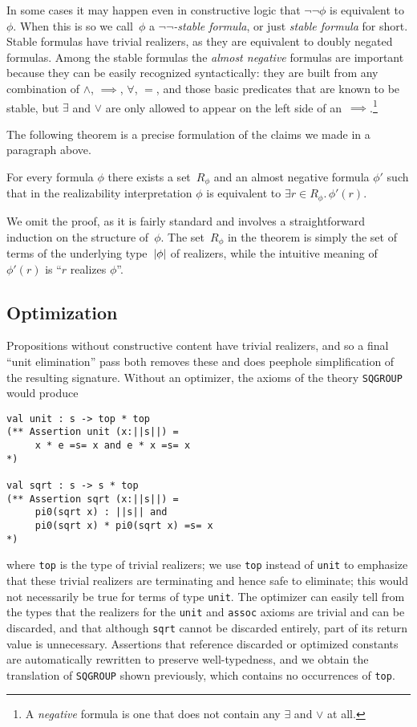 In some cases it may happen even in constructive logic that
$\lnot\lnot\phi$ is equivalent to~$\phi$. When this is so we
call~$\phi$ a \emph{$\lnot\lnot$-stable formula}, or just \emph{stable
  formula} for short. Stable formulas have trivial realizers, as they
are equivalent to doubly negated formulas. Among the stable formulas
the \emph{almost negative} formulas are important because they can be
easily recognized syntactically: they are built from any combination
of $\land$, $\implies$, $\forall$, $=$, and those basic predicates
that are known to be stable, but $\exists$ and $\lor$ are only allowed
to appear on the left side of an~$\implies$.\footnote{A
  \emph{negative} formula is one that does not contain any $\exists$
  and $\lor$ at all.}

The following theorem is a precise formulation of the claims we made
in a paragraph above.

\begin{theorem}
  For every formula $\phi$ there exists a set~$R_\phi$ and an almost
  negative formula $\phi'$ such that in the realizability
  interpretation $\phi$ is equivalent to $\exists r \in R_\phi . \,
  \phi'(r)$.
\end{theorem}

We omit the proof, as it is fairly standard and involves a
straightforward induction on the structure of~$\phi$. The set~$R_\phi$
in the theorem is simply the set of terms of the underlying
type~$|\phi|$ of realizers, while the intuitive meaning of
$\phi'(r)$ is ``$r$ realizes $\phi$''.





\subsection{Optimization}
Propositions without constructive content have trivial realizers, and
so a final ``unit elimination'' pass both removes these and does 
peephole simplification of the resulting signature.   Without an optimizer,
the axioms of the theory \Verb|SQGROUP| would produce
\begin{Verbatim}
val unit : s -> top * top
(** Assertion unit (x:||s||) =  
     x * e =s= x and e * x =s= x
*)

val sqrt : s -> s * top
(** Assertion sqrt (x:||s||) =  
     pi0(sqrt x) : ||s|| and 
     pi0(sqrt x) * pi0(sqrt x) =s= x
*)
\end{Verbatim}
where \Verb|top| is the type of trivial realizers; we use 
\Verb|top| instead of \Verb|unit| to emphasize that these trivial realizers are terminating and hence safe to eliminate; this would not necessarily
be true for terms of type \Verb|unit|.  The optimizer can
easily tell from the types that the realizers for the \Verb|unit| and
\Verb|assoc| axioms are trivial and can be discarded, and that
although \Verb|sqrt| cannot be discarded entirely, part of its return
value is unnecessary.  Assertions that reference discarded or optimized
constants are automatically rewritten to preserve well-typedness, and we obtain the translation of \Verb|SQGROUP| shown previously, which contains no
occurrences of \Verb|top|.


